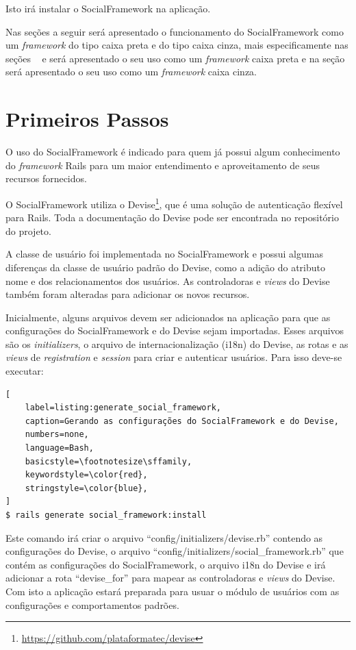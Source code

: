 Isto irá instalar o SocialFramework na aplicação.

Nas seções a seguir será apresentado o funcionamento do SocialFramework como um \textit{framework} do tipo caixa preta e do tipo caixa cinza, mais especificamente nas seções ~ e  será apresentado o seu uso como um \textit{framework} caixa preta e na seção  será apresentado o seu uso como um \textit{framework} caixa cinza.

\section{Primeiros Passos}
\label{sec:primeiros_passos}

O uso do SocialFramework é indicado para quem já possui algum conhecimento do \textit{framework} Rails para um maior entendimento e aproveitamento de seus recursos fornecidos.

O SocialFramework utiliza o Devise\footnote{\url{https://github.com/plataformatec/devise}}, que é uma solução de autenticação flexível para Rails. Toda a documentação do Devise pode ser encontrada no repositório do projeto.

A classe de usuário foi implementada no SocialFramework e possui algumas diferenças da classe de usuário padrão do Devise, como a adição do atributo nome e dos relacionamentos dos usuários. As controladoras e \textit{views} do Devise também foram alteradas para adicionar os novos recursos.

Inicialmente, alguns arquivos devem ser adicionados na aplicação para que as configurações do SocialFramework e do Devise sejam importadas. Esses arquivos são os \textit{initializers}, o arquivo de internacionalização (i18n) do Devise, as rotas e as \textit{views} de \textit{registration} e \textit{session} para criar e autenticar usuários. Para isso deve-se executar:

\begin{lstlisting}[
    label=listing:generate_social_framework,
    caption=Gerando as configurações do SocialFramework e do Devise,
    numbers=none,
    language=Bash,
    basicstyle=\footnotesize\sffamily,
    keywordstyle=\color{red},
    stringstyle=\color{blue},
]
$ rails generate social_framework:install
\end{lstlisting}

Este comando irá criar o arquivo ``config/initializers/devise.rb'' contendo as configurações do Devise, o arquivo ``config/initializers/social\_framework.rb'' que contém as configurações do SocialFramework, o arquivo i18n do Devise e irá adicionar a rota ``devise\_for'' para mapear as controladoras e \textit{views} do Devise. Com isto a aplicação estará preparada para usuar o módulo de usuários com as configurações e comportamentos padrões.

